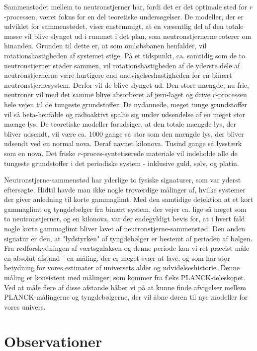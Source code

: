 \documentclass[twocolumn]{article}
\begin{document}
Sammenstødet mellem to neutronstjerner har, fordi det er det optimale sted for $r$-processen, været fokus for en del teoretiske undersøgelser. De modeller, der er udviklet for sammenstødet, viser enstemmigt, at en væsentlig del af den totale masse vil blive slynget ud i rummet i det plan, som neutronstjernerne roterer om hinanden. Grunden til dette er, at som omløbsbanen henfalder, vil rotationshastigheden af systemet stige. På et tidspunkt, ca. samtidig som de to neutronstjerner støder sammen, vil rotationshastigheden af de yderste dele af neutronstjernerne være hurtigere end undvigelseshastigheden for en binært neutronstjernesystem. Derfor vil de blive slynget ud. Den store mængde, nu frie, neutroner vil med det samme blive absorberet af jern-laget og drive $r$-processen hele vejen til de tungeste grundstoffer. De nydannede, meget tunge grundstoffer vil så beta-henfalde og radioaktivt spalte sig under udsendelse af en meget stor mænge lys. De teoretiske modeller forudsiger, at den totale mængde lys, der bliver udsendt, vil være ca. 1000 gange så stor som den mængde lys, der bliver udsendt ved en normal nova. Deraf navnet kilonova. Tusind gange så lysstærk som en nova. Det friske $r$-proces-syntetiserede materiale vil indeholde alle de tungeste grundstoffer i det periodiske system - inklusive guld, sølv, og platin.

Neutronstjerne-sammenstød har yderlige to fysiske signaturer, som var yderst eftersøgte. Hidtil havde man ikke nogle troværdige målinger af, hvilke systemer der giver anledning til korte gammaglimt. Med den samtidige detektion at et kort gammaglimt og tyngdebølger fra binært system, der vejer ca. lige så meget som to neutronstjerner, og en kilonova, var der endegyldigt bevis for, at i hvert fald nogle korte gammaglimt bliver lavet af neutronstjerne-sammenstød. Den anden signatur er den, at "lydstyrken" af tyngdebølger er bestemt af perioden af bølgen. Fra rødforskydningen af værtsgalaksen og denne periode kan vi ret præcist måle en absolut afstand - en måling, der er meget svær at lave, og som har stor betydning for vores estimater af universets alder og udvidelseshistorie. Denne måling er konsistent med målinger, som kommer fra f.eks PLANCK-teleskopet. Ved at måle flere af disse afstande håber vi på at kunne finde afvigelser mellem PLANCK-målingerne og tyngdebølgerne, der vil åbne døren til nye modeller for vores univers.


\section{Observationer}\label{obs}
\end{document}
